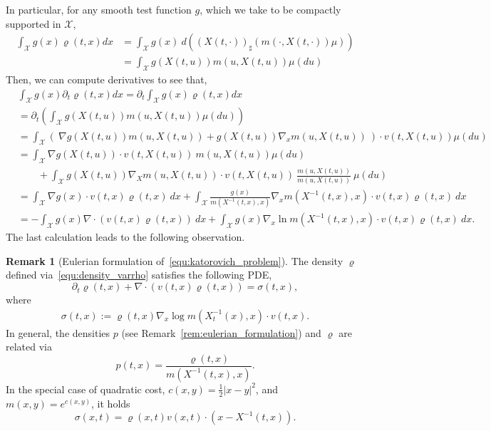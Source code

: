 \documentclass{article}
\theoremstyle{definition}
\newtheorem{remark}[theorem]{Remark}
\begin{document}
In particular, for any smooth test function $g$, which we take to be compactly supported in $\mathcal X$,
\begin{align*}
\int_\mathcal X g(x)\varrho(t,x)dx &= \int_\mathcal X g(x) \ d\left(\left( X(t, \cdot) \right)_{\sharp} \left(m(\cdot,X(t,\cdot)) \mu \right)\right)\\
&= \int_\mathcal X g(X(t,u)) m(u, X(t,u)) \mu(du)
\end{align*}
Then, we can compute derivatives to see that,
\begin{align*}
    & \int_\mathcal X g(x)\partial_t\varrho(t,x)dx  = \partial_t \int_\mathcal X g(x)\varrho(t,x)dx  \\
    &= \partial_t \left( \int_\mathcal X g(X(t,u)) m(u, X(t,u)) \mu(du) \right) \\
    &= \int_\mathcal X \left( \ \nabla g(X(t,u)) m(u, X(t,u)) + g(X(t,u))\nabla_x m(u, X(t,u)) \ \right) \cdot v(t,X(t,u)) \mu(du) \\
    &=\int_{\mathcal{X}} \nabla g(X(t,u)) \cdot v(t,X(t,u))  \ m(u, X(t,u)) \mu (du) \\&\quad\quad + \int_\mathcal X g(X(t,u)) \nabla_X m(u,X(t,u))  \cdot v(t, X(t,u)) \ \frac{m(u,X(t,u))}{m(u,X(t,u))} \ \mu (du) \\
    &=\int_\mathcal X \nabla g(x) \cdot v(t, x) \varrho(t, x) \ dx + \int_\mathcal X \frac{g(x)}{m(X^{-1}(t,x),x)}\nabla_x m(X^{-1}(t,x),x)\cdot v(t,x) \varrho(t,x) \ dx\\
    &= -\int_\mathcal X g(x) \nabla \cdot (v(t,x) \varrho(t,x)) \ dx + \int_\mathcal X g(x) \nabla_x \ln m(X^{-1}(t,x), x) \cdot v(t, x) \varrho(t, x) \ dx.
\end{align*}
The last calculation leads to the following observation.
\begin{remark}[Eulerian formulation of~\eqref{equ:katorovich_problem}]
    The density $\varrho$ defined via~\eqref{equ:density_varrho} satisfies the following PDE,
\[
\partial_t \varrho(t, x) + \nabla \cdot (v(t,x)\varrho(t,x)) = \sigma(t,x),
\]
where 
\begin{align*}
    \sigma(t,x) := \varrho(t,x)\nabla_x \log  m(X^{-1}_t(x), x) \cdot v(t,x).
\end{align*}
In general, the densities $p$ (see Remark~\ref{rem:eulerian_formulation}) and $\varrho$ are related via
\[
p(t,x) = \frac{\varrho(t,x)}{m(X^{-1}(t,x),x)}.
\]
In the special case of quadratic cost, $c(x,y) = \frac12 |x-y|^2$, and $m(x,y) = e^{c(x,y)}$, it holds $$\sigma(x,t) = \varrho(x,t)v(x,t)\cdot \left( x - X^{-1}(t,x)\right).$$
\end{remark}
\end{document}
